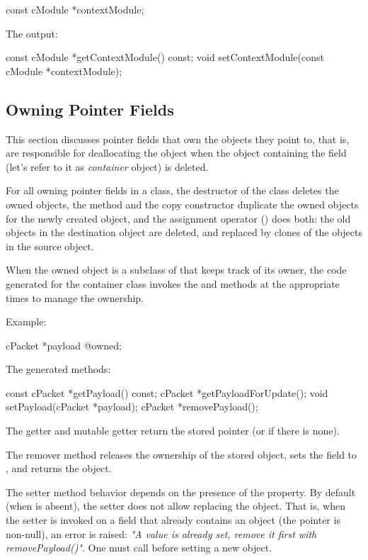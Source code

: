 \begin{msg}
const cModule *contextModule;
\end{msg}

The output:

\begin{cpp}
const cModule *getContextModule() const;
void setContextModule(const cModule *contextModule);
\end{cpp}


\subsection{Owning Pointer Fields}
\label{sec:msg-defs:pointers-fields}

This section discusses pointer fields that own the objects they point to, that
is, are responsible for deallocating the object when the object containing the
field (let's refer to it as \textit{container} object) is deleted.

For all owning pointer fields in a class, the destructor of the class deletes the
owned objects, the  method and the copy constructor duplicate the
owned objects for the newly created object, and the assignment operator
() does both: the old objects in the destination object are
deleted, and replaced by clones of the objects in the source object.

When the owned object is a subclass of  that keeps track of
its owner, the code generated for the container class invokes the 
and  methods at the appropriate times to manage the ownership.

Example:

\begin{msg}
cPacket *payload @owned;
\end{msg}

The generated methods:

\begin{cpp}
const cPacket *getPayload() const;
cPacket *getPayloadForUpdate();
void setPayload(cPacket *payload);
cPacket *removePayload();
\end{cpp}

The getter and mutable getter return the stored pointer (or  if
there is none).

The remover method releases the ownership of the stored object, sets the field
to , and returns the object.

The setter method behavior depends on the presence of the 
property. By default (when  is absent), the setter does not
allow replacing the object. That is, when the setter is invoked on a field that
already contains an object (the pointer is non-null), an error is raised:
\textit{"A value is already set, remove it first with removePayload()"}.
One must call  before setting a new object.

